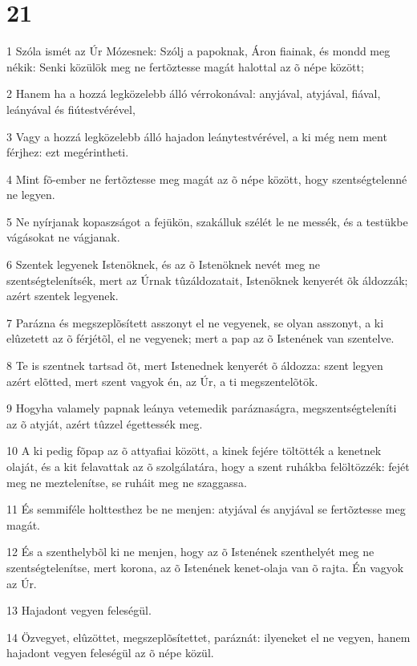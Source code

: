 \chapter{21}

\par 1 Szóla ismét az Úr Mózesnek: Szólj a papoknak, Áron fiainak, és mondd meg nékik: Senki közülök meg ne fertõztesse magát halottal az õ népe között;
\par 2 Hanem ha a hozzá legközelebb álló vérrokonával: anyjával, atyjával, fiával, leányával és fiútestvérével,
\par 3 Vagy a hozzá legközelebb álló hajadon leánytestvérével, a ki még nem ment férjhez: ezt megérintheti.
\par 4 Mint fõ-ember ne fertõztesse meg magát az õ népe között, hogy szentségtelenné ne legyen.
\par 5 Ne nyírjanak kopaszságot a fejükön, szakálluk szélét le ne messék, és a testükbe vágásokat ne vágjanak.
\par 6 Szentek legyenek Istenöknek, és az õ Istenöknek nevét meg ne szentségtelenítsék, mert az Úrnak tûzáldozatait, Istenöknek kenyerét õk áldozzák; azért szentek legyenek.
\par 7 Parázna és megszeplõsített asszonyt el ne vegyenek, se olyan asszonyt, a ki elûzetett az õ férjétõl, el ne vegyenek; mert a pap az õ Istenének van szentelve.
\par 8 Te is szentnek tartsad õt, mert Istenednek kenyerét õ áldozza: szent legyen azért elõtted, mert szent vagyok én, az Úr, a ti megszentelõtök.
\par 9 Hogyha valamely papnak leánya vetemedik paráznaságra, megszentségteleníti az õ atyját, azért tûzzel égettessék meg.
\par 10 A ki pedig fõpap az õ attyafiai között, a kinek fejére töltötték a kenetnek olaját, és a kit felavattak az õ szolgálatára, hogy a szent ruhákba felöltözzék: fejét meg ne meztelenítse, se ruháit meg ne szaggassa.
\par 11 És semmiféle holttesthez be ne menjen: atyjával és anyjával se fertõztesse meg magát.
\par 12 És a szenthelybõl ki ne menjen, hogy az õ Istenének szenthelyét meg ne szentségtelenítse, mert korona, az õ Istenének kenet-olaja van õ rajta. Én vagyok az Úr.
\par 13 Hajadont vegyen feleségül.
\par 14 Özvegyet, elûzöttet, megszeplõsítettet, paráznát: ilyeneket el ne vegyen, hanem hajadont vegyen feleségül az õ népe közül.
